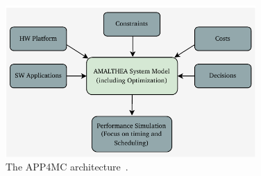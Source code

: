 \begin{figure}[ht]
\centering
\includegraphics[width= 0.85\textwidth]{figures/amalthea_approach1.pdf}
\caption{The APP4MC architecture~\cite{askaripoor2023designer}.}
\label{fig06}
\end{figure}


